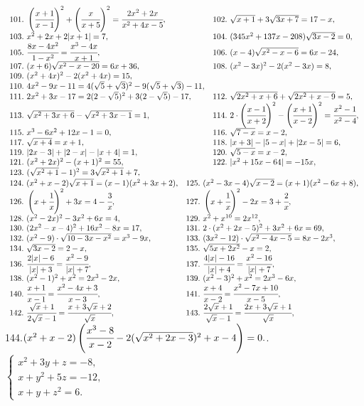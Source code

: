 \documentclass[12pt]{article}
\begin{document}
$\begin{array}{ll}
101.\ \left(\cfrac{x+1}{x-1}\right)^2+\left(\cfrac{x}{x+5}\right)^2=\cfrac{2x^2+2x}{x^2+4x-5},&
102.\ \sqrt{x+1}+3\sqrt{3x+7}=17-x,\\
103.\ x^2+2x+2|x+1|=7,&
104.\ (345x^2+137x-208)\sqrt{3x-2}=0,\\
105.\ \cfrac{8x-4x^2}{1-x^2}=\cfrac{x^3-4x}{x+1},&
106.\ (x-4)\sqrt{x^2-x-6}=6x-24,\\
107.\ (x+6)\sqrt{x^2-x-20}=6x+36,&
108.\ (x^2-3x)^2-2(x^2-3x)=8,\\
109.\ (x^2+4x)^2-2(x^2+4x)=15,\\
110.\ 4x^2-9x-11=4(\sqrt{5}+\sqrt{3})^2-9(\sqrt{5}+\sqrt{3})-11,\\
111.\ 2x^2+3x-17=2(2-\sqrt{5})^2+3(2-\sqrt{5})-17,&
112.\ \sqrt{2x^2+x+6}+\sqrt{2x^2+x-9}=5,\\
113.\ \sqrt{x^2+3x+6}-\sqrt{x^2+3x-1}=1,&
114.\ 2\cdot\left(\cfrac{x-1}{x+2}\right)^2-\left(\cfrac{x+1}{x-2}\right)^2=\cfrac{x^2-1}{x^2-4},\\
115.\ x^3-6x^2+12x-1=0,&
116.\ \sqrt{7-x}=x-2,\\
117.\ \sqrt{x+4}=x+1,&
118.\ |x+3|-|5-x|+|2x-5|=6,\\
119.\ |2x-3|+|2-x|-|x+4|=1,&
120.\ \sqrt{5-x}=x-2,\\
121.\ (x^2+2x)^2-(x+1)^2=55,&
122.\ |x^2+15x-64|=-15x,\\
123.\ (\sqrt{x^2+1}-1)^2=3\sqrt{x^2+1}+7,\end{array}$\\
$\begin{array}{ll}
124.\ (x^2+x-2)\sqrt{x+1}=(x-1)(x^2+3x+2),&
125.\ (x^2-3x-4)\sqrt{x-2}=(x+1)(x^2-6x+8),\\
126.\ \left(x+\cfrac{1}{x}\right)^2+3x=4-\cfrac{3}{x},&
127.\ \left(x+\cfrac{1}{x}\right)^2-2x=3+\cfrac{2}{x},\\
128.\ (x^2-2x)^2-3x^2+6x=4,&
129.\ x^2+x^{10}=2x^{12},\\
130.\ (2x^2-x-4)^2+16x^2-8x=17,&
131.\ 2\cdot(x^2+2x-5)^2+3x^2+6x=69,\\
132.\ (x^2-9)\cdot\sqrt{10-3x-x^2}=x^3-9x,&
133.\ (3x^2-12)\cdot\sqrt{x^2-4x-5}=8x-2x^3,\\
134.\ \sqrt{3x-2}=2-x,&
135.\ \sqrt{5x+2x^2}-x=2,\\
136.\ \cfrac{2|x|-6}{|x|+3}=\cfrac{x^2-9}{|x|+7},&
137.\ \cfrac{4|x|-16}{|x|+4}=\cfrac{x^2-16}{|x|+7},\\
138.\ (x^2-1)^2+x^2=2x^3-2x,&
139.\ (x^2-3)^2+x^2=2x^3-6x,\\
140.\ \cfrac{x+1}{x-1}=\cfrac{x^2-4x+3}{x-3},&
141.\ \cfrac{x+4}{x-2}=\cfrac{x^2-7x+10}{x-5},\\
142.\ \cfrac{\sqrt{x}+1}{2\sqrt{x}-1}=\cfrac{x+3\sqrt{x}+2}{\sqrt{x}},&
143.\ \cfrac{2\sqrt{x}+1}{\sqrt{x}-1}=\cfrac{2x+3\sqrt{x}+1}{\sqrt{x}},
\end{array}$\\
144.$ (x^2+x-2)\left(\cfrac{x^3-8}{x-2}-2(\sqrt{x^2+2x-3})^2
+x-4\right)=0.$. $\begin{cases} x^2+3y+z=-8,\\ x+y^2+5z=-12,\\ x+y+z^2=6.\end{cases}$
\newpage
\end{document}
